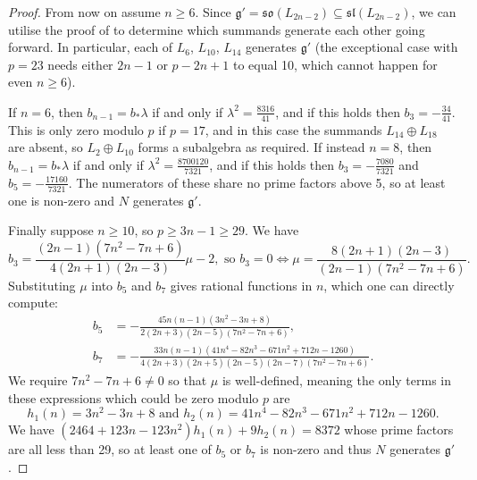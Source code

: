 \documentclass[11pt,a4paper,reqno]{amsart}
\theoremstyle{definition}
\numberwithin{equation}{section}
\newcommand{\fg}{\mathfrak{g}}
\newcommand{\fsl}{\mathfrak{sl}}
\newcommand{\fso}{\mathfrak{so}}
\begin{document}
\begin{proof}
From now on assume $n\geq6$. Since $\fg'=\fso(L_{2n-2})\subseteq\fsl(L_{2n-2})$, we can utilise the proof of \cite[Proposition~4.2.2]{CEN} to determine which summands generate each other going forward. In particular, each of $L_6$, $L_{10}$, $L_{14}$ generates $\fg'$ (the exceptional case with $p=23$ needs either $2n-1$ or $p-2n+1$ to equal 10, which cannot happen for even $n\geq6$).

If $n=6$, then $b_{n-1}=b_*\lambda$ if and only if $\lambda^2=\frac{8316}{41}$, and if this holds then $b_3=-\frac{34}{41}$. This is only zero modulo $p$ if $p=17$, and in this case the summands $L_{14}\oplus L_{18}$ are absent, so $L_2\oplus L_{10}$ forms a subalgebra as required. If instead $n=8$, then $b_{n-1}=b_*\lambda$ if and only if $\lambda^2=\frac{8700120}{7321}$, and if this holds then $b_3=-\frac{7080}{7321}$ and $b_5=-\frac{17160}{7321}$. The numerators of these share no prime factors above 5, so at least one is non-zero and $N$ generates $\fg'$.

Finally suppose $n\geq10$, so $p\geq3n-1\geq29$. We have
\[b_3=\frac{(2n-1)(7n^2-7n+6)}{4(2n+1)(2n-3)}\mu-2,\text{ so }b_3=0\iff\mu=\frac{8(2n+1)(2n-3)}{(2n-1)(7n^2-7n+6)}.\]
Substituting $\mu$ into $b_5$ and $b_7$ gives rational functions in $n$, which one can directly compute:
\begin{align*}
b_5&=-\frac{45n(n-1)(3n^2-3n+8)}{2(2n+3)(2n-5)(7n^2-7n+6)},\\
b_7&=-\frac{33n(n-1)(41n^4-82n^3-671n^2+712n-1260)}{4(2n+3)(2n+5)(2n-5)(2n-7)(7n^2-7n+6)}.
\end{align*}
We require $7n^2-7n+6\neq0$ so that $\mu$ is well-defined, meaning the only terms in these expressions which could be zero modulo $p$ are
\[h_1(n)=3n^2-3n+8\text{ and }h_2(n)=41n^4-82n^3-671n^2+712n-1260.\]
We have $(2464+123n-123n^2)h_1(n)+9h_2(n)=8372$ whose prime factors are all less than 29, so at least one of $b_5$ or $b_7$ is non-zero and thus $N$ generates $\fg'$.
\end{proof}
\end{document}
